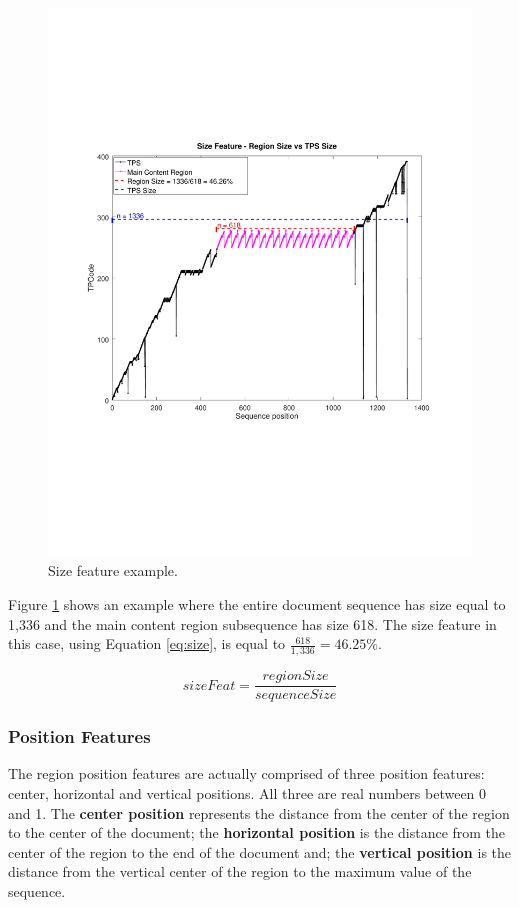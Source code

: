 \begin{figure}[h]
  \centering
     \includegraphics[trim={2.0cm 7.0cm 2.2cm 7.4cm}, clip, 
     width=\columnwidth]{img/size.pdf}
  \caption{Size feature example.}
  \label{fig:size}
\end{figure}

Figure \ref{fig:size} shows an example where the entire document sequence has
size equal to 1,336 and the main content region subsequence has size 618. The
size feature in this case, using Equation \ref{eq:size}, is equal to
$\frac{618}{1,336} = 46.25\%$.

\begin{equation}\label{eq:size}
    sizeFeat = \frac{regionSize}{sequenceSize}
\end{equation}

\subsubsection{Position Features}\label{ss:pos}
The region position features are actually comprised of three position features:
center, horizontal and vertical positions. All three are real numbers between 0
and 1. The \textbf{center position} represents the distance from the center of
the region to the center of the document; the \textbf{horizontal position} is
the distance from the center of the region to the end of the document and; the
\textbf{vertical position} is the distance from the vertical center of the
region to the maximum value of the sequence.

